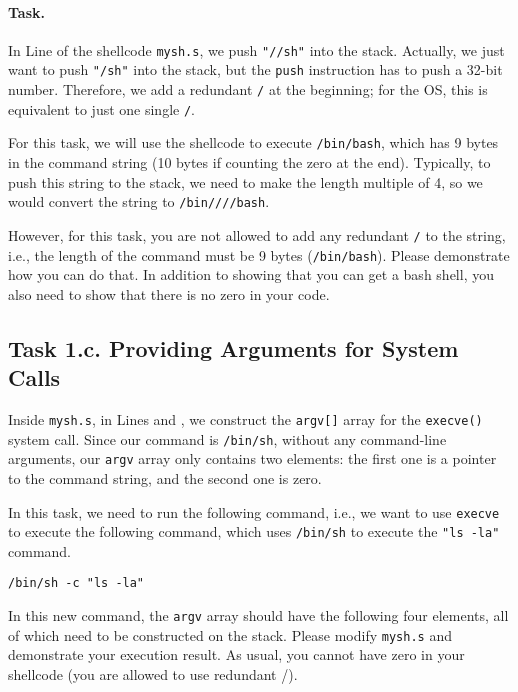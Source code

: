 \paragraph{Task.}
In Line  of the shellcode \texttt{mysh.s}, 
we push \texttt{"//sh"} into the stack. Actually, we 
just want to push \texttt{"/sh"} into the stack, but 
the \texttt{push} instruction has to push a 32-bit number.
Therefore, we add a redundant \texttt{/} at the beginning; 
for the OS, this is equivalent to just one single \texttt{/}.  


For this task, we will use the shellcode to execute
\texttt{/bin/bash}, which has 9 bytes in the command string (10 bytes if 
counting the zero at the end). Typically, to push
this string to the stack, we need to make the length
multiple of 4, so we would convert the string
to \texttt{/bin////bash}. 

However, for this task,   
you are not allowed to add any
redundant \texttt{/} to the string, i.e., the length of the 
command must be 9 bytes (\texttt{/bin/bash}).
Please demonstrate how you can do that.
In addition to showing that you can get a bash shell, you also
need to show that there is no zero in your code. 



\subsection{Task 1.c. Providing Arguments for System Calls}
 
Inside \texttt{mysh.s}, in Lines  and ,
we construct the \texttt{argv[]} array for the 
\texttt{execve()} system call. Since 
our command is \texttt{/bin/sh}, without any command-line
arguments, our \texttt{argv} array only contains 
two elements: the first one is a pointer to 
the command string, and the second one is zero. 

In this task, we need to run the 
following command, i.e., we want to use 
\texttt{execve} to execute the following command, which
uses \texttt{/bin/sh} to execute the \texttt{"ls -la"}
command. 

\begin{lstlisting}
/bin/sh -c "ls -la"
\end{lstlisting}

In this new command, the \texttt{argv} array should have 
the following four elements, all of which need to be 
constructed on the stack. Please modify \texttt{mysh.s} and 
demonstrate your execution result. As usual, you cannot have 
zero in your shellcode (you are allowed to use redundant /). 

